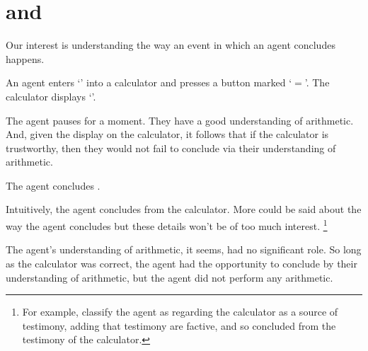 \chapter{\qWhy{} and \qHow{}}
\label{cha:intro}

\begin{note}
  Our interest is understanding the way an event in which an agent concludes happens.

  \begin{scenario}[Multiplication]%
    \label{illu:gist:calc}%
    An agent enters `\gistCalcLHS{}' into a calculator and presses a button marked `\(=\)'.
    The calculator displays `\gistCalcRHS{}'.

    The agent pauses for a moment.
    They have a good understanding of arithmetic.
    And, given the display on the calculator, it follows that if the calculator is trustworthy, then they would not fail to conclude \propM{\gistCalcEq{}} via their understanding of arithmetic.

    The agent concludes \propM{\gistCalcEq{}}.
  \end{scenario}

  \noindent%
  Intuitively, the agent concludes \propM{\gistCalcEq{}} from the calculator.
  More could be said about the way the agent concludes but these details won't be of too much interest.%
  \footnote{
    For example, classify the agent as regarding the calculator as a source of testimony, adding that testimony are factive, and so concluded \propM{\gistCalcEq{}} from the testimony of the calculator.
  }

  The agent's understanding of arithmetic, it seems, had no significant role.
  So long as the calculator was correct, the agent had the opportunity to conclude \propM{\gistCalcEq{}} by their understanding of arithmetic, but the agent did not perform any arithmetic.
\end{note}


